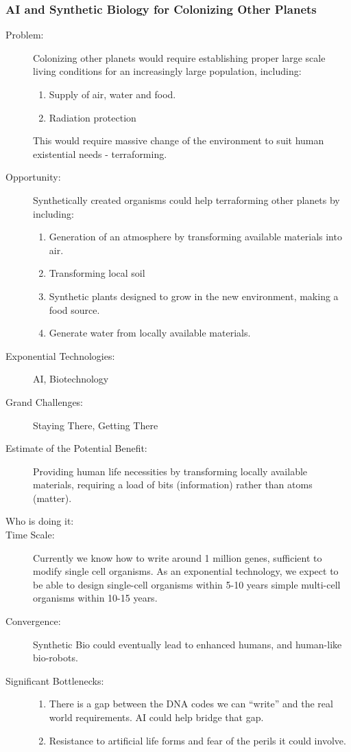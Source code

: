 \subsubsection{AI and Synthetic Biology for Colonizing Other Planets}
  \begin{description}
\item[Problem:]Colonizing other planets would  require establishing proper large scale living conditions for an  increasingly large population, including:
\hfill\begin{enumerate}
\item Supply of air, water and food.
\item Radiation protection
\end{enumerate}
 
This would require massive change of  the environment to suit human existential needs - terraforming. 
 
\item[Opportunity:]Synthetically created organisms  could help terraforming other planets 
by  including:
\hfill\begin{enumerate}
\item Generation of an atmosphere by  transforming available materials into air.
\item Transforming local soil 
\item Synthetic plants designed to grow  in the new environment, making a food source.
\item Generate water from locally  available materials. 
\end{enumerate}
 
 \item[Exponential  Technologies:] AI,  Biotechnology
  \item[Grand Challenges:] Staying There, Getting There
  \item[Estimate of the Potential  Benefit:]Providing human life necessities by transforming locally  available materials, requiring a load of bits (information) rather than  atoms (matter).
  \item[Who is doing it:]
 \item[Time Scale:] Currently we know how to write around 1 million genes,  sufficient to modify single cell organisms. As an exponential  technology, we expect to be able to design single-cell organisms within  5-10 years simple multi-cell organisms within 10-15 years. 
  \item[Convergence:] Synthetic Bio could eventually  lead to enhanced humans, and human-like bio-robots.
  \item[Significant  Bottlenecks:]
  \hfill\begin{enumerate}
  \item There is a gap between the DNA  codes we can ``write'' and the real world requirements. AI could help  bridge that gap.
  \item Resistance to artificial life  forms and fear of the perils it could involve.
  \end{enumerate}
\end{description}

